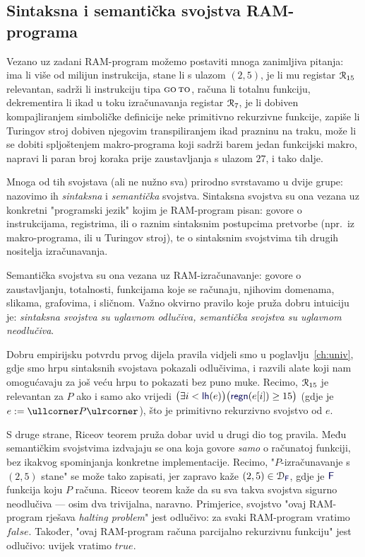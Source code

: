 \subsection{Sintaksna i semantička svojstva RAM-programa}

Vezano uz zadani RAM-program možemo postaviti mnoga zanimljiva pitanja: ima li više od milijun instrukcija, stane li s ulazom $(2,5)$, je li mu registar $\mathcal R_{15}$ relevantan, sadrži li instrukciju tipa $\textsc{go\,to}$, računa li totalnu funkciju, dekrementira li ikad u toku izračunavanja registar $\mathcal R_{7}$, je li dobiven kompajliranjem simboličke definicije neke primitivno rekurzivne funkcije, zapiše li Turingov stroj dobiven njegovim transpiliranjem ikad prazninu na traku, može li se dobiti spljoštenjem makro-programa koji sadrži barem jedan funkcijski makro, napravi li paran broj koraka prije zaustavljanja s ulazom $27$, i tako dalje.

Mnoga od tih svojstava (ali ne nužno sva) prirodno svrstavamo u dvije grupe: nazovimo ih \emph{sintaksna} i \emph{semantička} svojstva. Sintaksna svojstva su ona vezana uz konkretni "programski jezik" kojim je RAM-program pisan: govore o instrukcijama, registrima, ili o raznim sintaksnim postupcima pretvorbe (npr.\ iz makro-programa, ili u Turingov stroj), te o sintaksnim svojstvima tih drugih nositelja izračunavanja.

Semantička svojstva su ona vezana uz RAM-izračunavanje: govore o zaustavljanju, totalnosti, funkcijama koje se računaju, njihovim domenama, slikama, grafovima, i sličnom. Važno okvirno pravilo koje pruža dobru intuiciju je: \emph{sintaksna svojstva su uglavnom odlučiva, semantička svojstva su uglavnom neodlučiva}.

Dobru empirijsku potvrdu prvog dijela pravila vidjeli smo u poglavlju~\ref{ch:univ}, gdje smo hrpu sintaksnih svojstava pokazali odlučivima, i razvili alate koji nam omogućavaju za još veću hrpu to pokazati bez puno muke. Recimo, $\mathcal R_{15}$ je relevantan za $P$ ako i samo ako vrijedi 
$\bigl(\exists i<\f{lh}(e)\bigr)\bigl(\f{regn}(e[i])\ge15\bigr)$ (gdje je $e:=\kprog P$), što je primitivno rekurzivno svojstvo od $e$.

S druge strane, Riceov teorem pruža dobar uvid u drugi dio tog pravila. Među semantičkim svojstvima izdvajaju se ona koja govore \emph{samo} o računatoj funkciji, bez ikakvog spominjanja konkretne implementacije. Recimo, "$P$-izračunavanje s $(2,5)$ stane" se može tako zapisati, jer zapravo kaže $(2,5)\in\dom{\f F}$, gdje je $\f F$ funkcija koju $P$ računa. Riceov teorem kaže da su sva takva svojstva sigurno neodlučiva --- osim dva trivijalna, naravno. Primjerice, svojstvo "ovaj RAM-program rješava \emph{halting problem}" jest odlučivo: za svaki RAM-program vratimo $\mathit{false}$. Također, "ovaj RAM-program računa parcijalno rekurzivnu funkciju" jest odlučivo: uvijek vratimo $\mathit{true}$.

